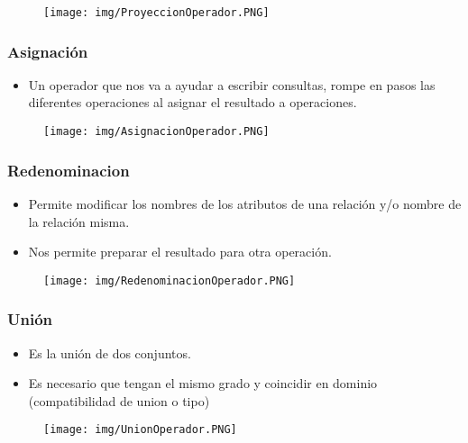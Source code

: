 \begin{figure}[!htb]
    \centering
    \texttt{[image: img/ProyeccionOperador.PNG]}
\end{figure}

\subsubsection*{Asignación}

\begin{itemize}
\item Un operador que nos va a ayudar a escribir consultas, rompe en pasos las diferentes operaciones al asignar el resultado a operaciones.
\end{itemize}


\begin{figure}[!htb]
    \centering
    \texttt{[image: img/AsignacionOperador.PNG]}
\end{figure}


\subsubsection*{Redenominacion}
\begin{itemize}
\item Permite modificar los nombres de los atributos de una relación y/o nombre de la relación misma.
\item Nos permite preparar el resultado para otra operación.
\end{itemize}


\begin{figure}[!htb]
    \centering
    \texttt{[image: img/RedenominacionOperador.PNG]}
\end{figure}

\newpage

\subsubsection*{Unión}
\begin{itemize}
\item Es la unión de dos conjuntos.
\item Es necesario que tengan el mismo grado y coincidir en dominio (compatibilidad de union o tipo)
\end{itemize}


\begin{figure}[!htb]
    \centering
    \texttt{[image: img/UnionOperador.PNG]}
\end{figure}

